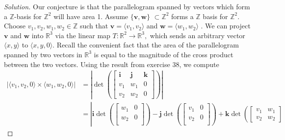 \documentclass[12pt]{article}
\newcommand{\Z}{\mathbb{Z}}
\newcommand{\R}{\mathbb{R}}
\newenvironment{exercise}[2][Exercise]{\begin{trivlist}
        \item[\hskip \labelsep {\bfseries #1}\hskip \labelsep {\bfseries #2.}]}{\end{trivlist}}
\newenvironment{solution}
        {\begin{proof}[Solution]}
                    {\end{proof}}
\begin{document}
\begin{exercise}{39}
\begin{enumerate}[label=(\alph*)]
            \begin{solution}
                Our conjecture is that the parallelogram spanned by vectors
                which form a \( \Z \)-basis for \( \Z^{2} \) will have area 1.
                Assume \( \{\mathbf{v} , \mathbf{w}\} \) \( \subset \Z^{2} \) forms a \(
                \Z \) basis for \( \Z^{2} . \) Choose \( v_{1} , v_{2} ,
                w_{1} , w_{2} \in \Z \) such that \( \mathbf{v} = \langle v_{1}
                , v_{2}\rangle \) and \( \mathbf{w} = \langle w_{1} , w_{2}
                \rangle \) . We can project \( \mathbf{v} \) and \( \mathbf{w}\) into \( \R^{3} \) via the linear map \( T : \R^{2} \to \R^{3},  \) which sends an arbitrary vector \( \langle x,y \rangle \) to \( \langle x,y,0 \rangle . \) Recall the convenient fact that the area of the parallelogram spanned by two vectors in \( \R^{3} \) is equal to the magnitude of the cross product between the two vectors. Using the result from exercise 38, we compute
                \begin{align*}
                    \left| \langle v_{1} , v_{2} , 0 \rangle \times\langle w_{1} , w_{2} , 0\rangle  \right| &= \left|\det\left(
                    \begin{bmatrix}
                        \mathbf{i} & \mathbf{j} & \mathbf{k} \\
                        v_{1} & w_{1} & 0\\
                        v_{2} & w_{2} & 0
                    \end{bmatrix}
                \right) \right|\\
                    &= \left| \mathbf{i} \det \left(
                    \begin{bmatrix}
                        w_{1} & 0\\
                        w_{2} & 0\\
                    \end{bmatrix}
                    \right) - \mathbf{j} \det \left(
                    \begin{bmatrix}
                        v_{1} & 0\\
                        v_{2} & 0\\
                    \end{bmatrix}
                    \right) + \mathbf{k} \det \left(
                    \begin{bmatrix}
                        v_{1} & w_{1} \\
                        v_{2} & w_{2}

\end{bmatrix}
\end{align*}
\end{solution}
\end{enumerate}
\end{exercise}
\end{document}
